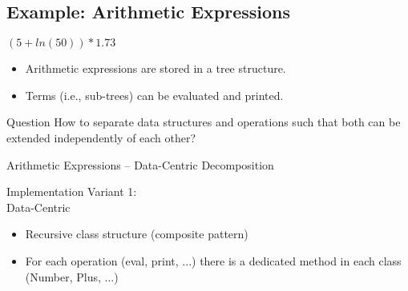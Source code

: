 \subsection{Example: Arithmetic Expressions}

\begin{frame}{\myframetitle}
	\begin{fancycolumns}[widths={60}]
		\begin{exampletight}{$(5 + ln(50)) * 1.73$}
			\centering
		\end{exampletight}
	\nextcolumn
		\begin{example}{}
			\begin{itemize}
				\item Arithmetic expressions are stored in a tree structure.
				\item Terms (i.e., sub-trees) can be evaluated and printed.
			\end{itemize}
		\end{example}
		\begin{note}{Question}
			How to separate data structures and operations such that both can be extended independently of each other?
		\end{note}
	\end{fancycolumns}
\end{frame}

\begin{frame}{Arithmetic Expressions -- Data-Centric Decomposition}
	\begin{fancycolumns}[widths={40},animation=none]
		\begin{definition}{Implementation Variant 1:\\Data-Centric}
			\begin{itemize}
				\item Recursive class structure (composite pattern)
				\item For each operation (eval, print, ...) there is a dedicated method in each class (Number, Plus, ...) 				
			\end{itemize}
		\end{definition}
	\nextcolumn
		\begin{exampletight}{}
		\end{exampletight}
	\end{fancycolumns}
\end{frame}

